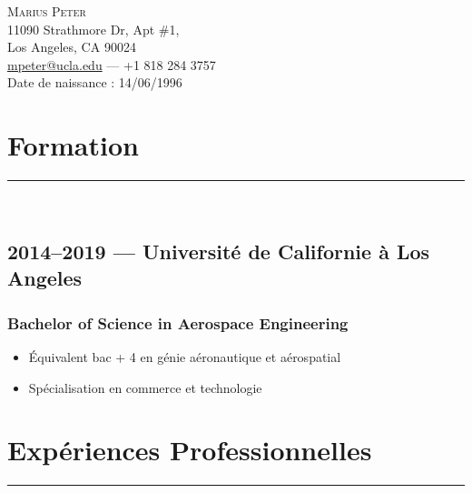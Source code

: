 \documentclass[10pt]{report}
\begin{document}
\centering
\huge \textsc{Marius Peter}\\[0.2cm]

\normalsize
11090 Strathmore Dr, Apt \#1,\\
Los Angeles, CA 90024\\[0.1cm]
\href{mailto:mpeter@ucla.edu}{mpeter@ucla.edu} --- +1 818 284 3757\\[0.1cm]
Date de naissance : 14/06/1996\\[1cm]


\section*{Formation}
\rule{\linewidth}{1pt}\\
\subsection*{2014--2019 --- Université de Californie à Los Angeles}
\subsubsection*{Bachelor of Science in Aerospace Engineering}
\begin{itemize}
    \item Équivalent bac + 4 en génie aéronautique et aérospatial
    \item Spécialisation en commerce et technologie
\end{itemize}

\section*{Expériences Professionnelles}
\rule{\linewidth}{1pt}\\
\end{document}
